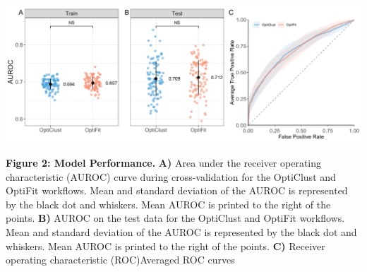 \documentclass[
]{article}
\begin{document}
\includegraphics{../exploratory/figures/figure2.pdf}

\textbf{Figure 2: Model Performance.} \textbf{A)} Area under the
receiver operating characteristic (AUROC) curve during cross-validation
for the OptiClust and OptiFit workflows. Mean and standard deviation of
the AUROC is represented by the black dot and whiskers. Mean AUROC is
printed to the right of the points. \textbf{B)} AUROC on the test data
for the OptiClust and OptiFit workflows. Mean and standard deviation of
the AUROC is represented by the black dot and whiskers. Mean AUROC is
printed to the right of the points. \textbf{C)} Receiver operating
characteristic (ROC)Averaged ROC curves
\end{document}
